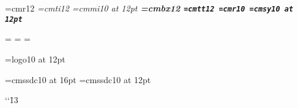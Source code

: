 
\ifx\pdfoutput\undefined
  
  \gdef\outline#1{}
\else 
   
   
  \gdef\outline#1{\pdfoutline goto page \the\pageno {/XYZ} {#1}}
\fi




\font\rm=cmr12
\font\it=cmti12
\font\mit=cmmi10 at 12pt
\font\bf=cmbx12
\font\tt=cmtt12
\font\tenrm=cmr10
\font\sy=cmsy10 at 12pt

=\rm
{}=\mit
{}=\sy


\font\manfnt=logo10 at 12pt

\font\chap=cmssdc10 at 16pt
\font\subchap=cmssdc10 at 12pt

\def\MP{{\manfnt META}\-{\manfnt POST}}    

\def\cvak{\ifdim\dimen0<6pt \dimen0=9pt \else \dimen0=3pt\fi}
\def\bodky{\leaders\hbox to12pt{\kern\dimen0.\hss}\hfil}

\def\chapter#1.{\eject\outline{#1}
	\skiplines2\centerline{\chap #1}
	\nobreak   \write1{\string\cvak\string\penalty-50
                    \string\Line{\string\bf\space #1\string\bodky\ \folio}}%
  \skiplines1}
\def\subchapter#1.{%
  \penalty-100\skiplines2\centerline{\subchap #1}\nobreak
  \write1{\string\cvak\string\Line{\string\quad\space
            #1\string\bodky\ \folio}}\nobreak
}
\def\subsubchapter#1.{%
  \penalty-100\skiplines2\leftline{\subchap #1}\nobreak
  \write1{\string\cvak\string\Line{\string\qquad\space
            #1\string\bodky\ \folio}}\nobreak
}
\def\skiplines#1{\par\hbox{}\nobreak\vskip-\baselineskip
                 \vskip#1\baselineskip}

\let\,\thinspace
\def\Nobreak{\let\brnobr\nobreak\nobreak}
\def\eq{=}

{\catcode`\catcode`\=13
 \gdef\itemize{%
   \par\nobreak\advance\leftskip1em%
   \let\brnobr\nobreak
   \catcode`\*13\def*{\par\brnobr\leavevmode\let\brnobr\relax
                      \llap{$\bullet$ }\ignorespaces}
   \catcode`\=13\def={\ifmmode\eq\else\unskip\
                      $\triangleright$ \ignorespaces\fi}
   }
}

